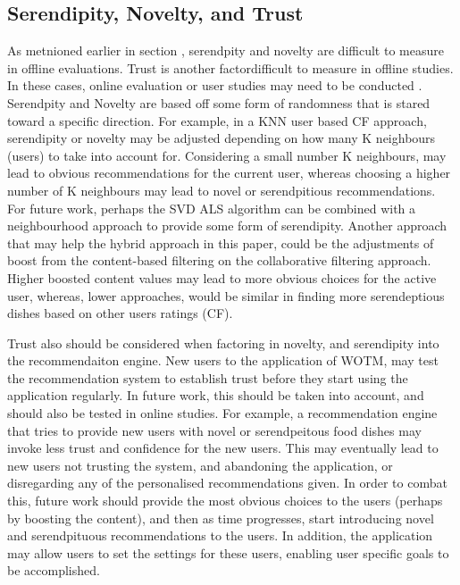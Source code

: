 \subsection{Serendipity, Novelty, and Trust}
As metnioned earlier in section , serendpity and novelty are difficult to measure in offline evaluations. Trust is another factordifficult to measure in offline studies. In these cases, online evaluation or user studies may need to be conducted . Serendpity and Novelty are based off some form of randomness that is stared toward a specific direction. For example, in a KNN user based CF approach, serendipity or novelty may be adjusted depending on how many K neighbours (users) to take into account for. Considering a small number K neighbours, may lead to obvious recommendations for the current user, whereas choosing a higher number of K neighbours may lead to novel or serendpitious recommendations. For future work, perhaps the SVD ALS algorithm can be combined with a neighbourhood approach to provide some form of serendipity. Another approach that may help the hybrid approach in this paper, could be the adjustments of boost from the content-based filtering on the collaborative filtering approach. Higher boosted content values may lead to more obvious choices for the active user, whereas, lower approaches, would be similar in finding more serendeptious dishes based on other users ratings (CF).  

Trust also should be considered when factoring in novelty, and serendipity into the recommendaiton engine. New users to the application of WOTM, may test the recommendation system to establish trust before they start using the application regularly. In future work, this should be taken into account, and should also be tested in online studies. For example, a recommendation engine that tries to provide new users with novel or serendpeitous food dishes may invoke less trust and confidence for the new users. This may eventually lead to new users not trusting the system, and abandoning the application, or disregarding any of the personalised recommendations given. In order to combat this, future work should provide the most obvious choices to the users (perhaps by boosting the content), and then as time progresses, start introducing novel and serendpituous recommendations to the users. In addition, the application may allow users to set the settings for these users, enabling user specific goals to be accomplished. 

